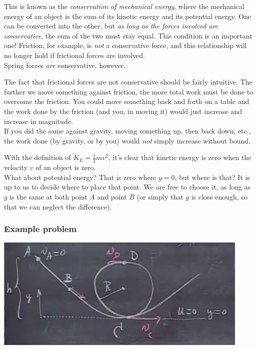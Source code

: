 \documentclass[12pt,a4paper]{report}
\begin{document}
This is known as the \emph{conservation of mechanical energy}, where the mechanical energy of an object is the sum of its kinetic energy and its potential energy. One can be converted into the other, but \emph{as long as the forces involved are conservative}, the sum of the two must stay equal. This condition is an important one! Friction, for example, is \emph{not} a conservative force, and this relationship will no longer hold if frictional forces are involved.\\
Spring forces \emph{are} conservative, however.

The fact that frictional forces are not conservative should be fairly intuitive. The further we move something against friction, the more total work must be done to overcome the friction. You could move something back and forth on a table and the work done by the friction (and you, in moving it) would just increase and increase in magnitude.\\
If you did the same against gravity, moving something up, then back down, etc., the work done (by gravity, or by you) would \emph{not} simply increase without bound.

With the definition of $K_E = \frac{1}{2} m v^2$, it's clear that kinetic energy is zero when the velocity $v$ of an object is zero.\\
What about potential energy? That is zero where $y = 0$, but where is that? It is up to us to decide where to place that point. We are free to choose it, as long as $g$ is the same at both point $A$ and point $B$ (or simply that $g$ is close enough, so that we can neglect the difference).

\subsubsection{Example problem}

\begin{center}
\includegraphics[scale=0.8]{Graphics/lec11_conservation}
\end{center}
\end{document}
